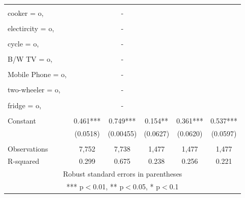 \begin{tabular}{lccccc}
 &  &  &  &  &  \\
cooker = o, &  & - &  &  &  \\
 &  &  &  &  &  \\
electircity = o, &  & - &  &  &  \\
 &  &  &  &  &  \\
cycle = o, &  & - &  &  &  \\
 &  &  &  &  &  \\
B/W TV = o, &  & - &  &  &  \\
 &  &  &  &  &  \\
Mobile Phone = o, &  & - &  &  &  \\
 &  &  &  &  &  \\
two-wheeler = o, &  & - &  &  &  \\
 &  &  &  &  &  \\
fridge = o, &  & - &  &  &  \\
 &  &  &  &  &  \\
Constant & 0.461*** & 0.749*** & 0.154** & 0.361*** & 0.537*** \\
 & (0.0518) & (0.00455) & (0.0627) & (0.0620) & (0.0597) \\
 &  &  &  &  &  \\
Observations & 7,752 & 7,738 & 1,477 & 1,477 & 1,477 \\
 R-squared & 0.299 & 0.675 & 0.238 & 0.256 & 0.221 \\ \hline
\multicolumn{6}{c}{ Robust standard errors in parentheses} \\
\multicolumn{6}{c}{ *** p$<$0.01, ** p$<$0.05, * p$<$0.1} \\
\end{tabular}
